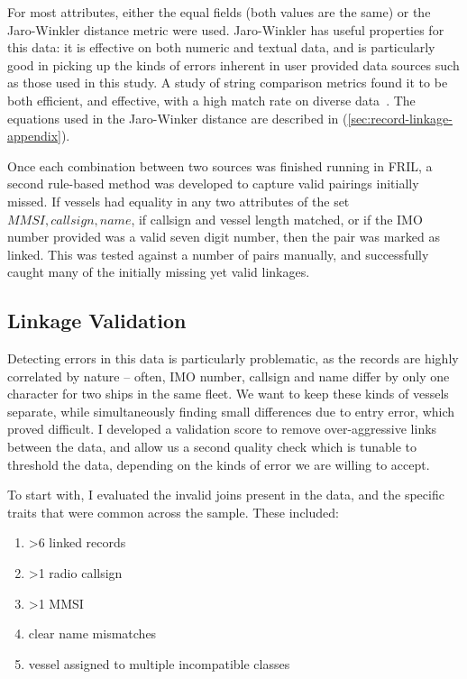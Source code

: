For most attributes, either the equal fields (both values are the same) or the Jaro-Winkler distance metric were used. Jaro-Winkler has useful properties for this data: it is effective on both numeric and textual data, and is particularly good in picking up the kinds of errors inherent in user provided data sources such as those used in this study. A study of string comparison metrics found it to be both efficient, and effective, with a high match rate on diverse data~\citep{Cohen2003}. The equations used in the Jaro-Winker distance are described in (\ref{sec:record-linkage-appendix}).

Once each combination between two sources was finished running in FRIL, a second rule-based method was developed to capture valid pairings initially missed. If vessels had equality in any two attributes of the set ${MMSI, callsign, name}$, if callsign and vessel length matched, or if the IMO number provided was a valid seven digit number, then the pair was marked as linked. This was tested against a number of pairs manually, and successfully caught many of the initially missing yet valid linkages.

\subsection{Linkage Validation}

Detecting errors in this data is particularly problematic, as the records are highly correlated by nature -- often, IMO number, callsign and name differ by only one character for two ships in the same fleet. We want to keep these kinds of vessels separate, while simultaneously finding small differences due to entry error, which proved difficult. I developed a validation score to remove over-aggressive links between the data, and allow us a second quality check which is tunable to threshold the data, depending on the kinds of error we are willing to accept.

To start with, I evaluated the invalid joins present in the data, and the specific traits that were common across the sample. These included:
\begin{enumerate}[noitemsep]
 \item >6 linked records
 \item >1 radio callsign
 \item >1 MMSI
 \item clear name mismatches
 \item vessel assigned to multiple incompatible classes
\end{enumerate}

